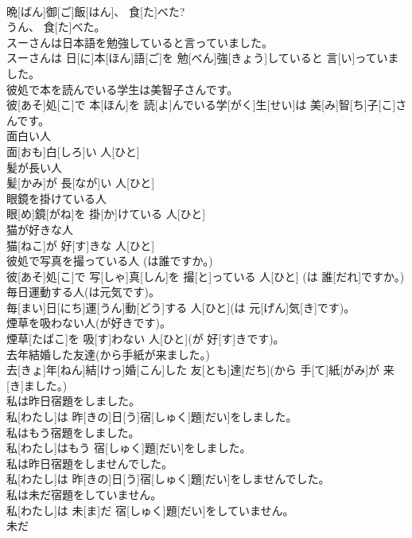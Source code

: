 \documentclass[8pt]{extreport}
\begin{document}
\begin{CJK}{UTF8}{min}
\\	晩[ばん]御[ご]飯[はん]、 食[た]べた? 
\\	うん、 食[た]べた。
\\	スーさんは日本語を勉強していると言っていました。	
\\	スーさんは 日[に]本[ほん]語[ご]を 勉[べん]強[きょう]していると 言[い]っていました。
\\	彼処で本を読んでいる学生は美智子さんです。	
\\	彼[あそ]処[こ]で 本[ほん]を 読[よ]んでいる学[がく]生[せい]は 美[み]智[ち]子[こ]さんです。
\\	面白い人	
\\	面[おも]白[しろ]い 人[ひと]
\\	髪が長い人	
\\	髪[かみ]が 長[なが]い 人[ひと]
\\	眼鏡を掛けている人	
\\	眼[め]鏡[がね]を 掛[か]けている 人[ひと]
\\	猫が好きな人	
\\	猫[ねこ]が 好[す]きな 人[ひと]
\\	彼処で写真を撮っている人 (は誰ですか。)	
\\	彼[あそ]処[こ]で 写[しゃ]真[しん]を 撮[と]っている 人[ひと] (は 誰[だれ]ですか。)
\\	毎日運動する人(は元気です)。	
\\	毎[まい]日[にち]運[うん]動[どう]する 人[ひと](は 元[げん]気[き]です)。
\\	煙草を吸わない人(が好きです)。	
\\	煙草[たばこ]を 吸[す]わない 人[ひと](が 好[す]きです)。
\\	去年結婚した友達(から手紙が来ました。)	
\\	去[きょ]年[ねん]結[けっ]婚[こん]した 友[とも]達[だち](から 手[て]紙[がみ]が 来[き]ました。)
\\	私は昨日宿題をしました。	
\\	私[わたし]は 昨[きの]日[う]宿[しゅく]題[だい]をしました。
\\	私はもう宿題をしました。	
\\	私[わたし]はもう 宿[しゅく]題[だい]をしました。
\\	私は昨日宿題をしませんでした。	
\\	私[わたし]は 昨[きの]日[う]宿[しゅく]題[だい]をしませんでした。
\\	私は未だ宿題をしていません。	
\\	私[わたし]は 未[ま]だ 宿[しゅく]題[だい]をしていません。
\\	未だ 

\end{CJK}
\end{document}
